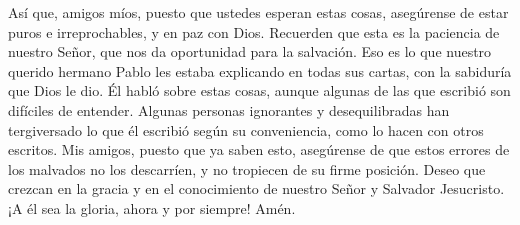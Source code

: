  Así que, amigos míos, puesto que ustedes esperan estas
cosas, asegúrense de estar puros e irreprochables, y en paz con Dios.
 Recuerden que esta es la paciencia de nuestro Señor, que
nos da oportunidad para la salvación. Eso es lo que nuestro querido
hermano Pablo les estaba explicando en todas sus cartas, con la
sabiduría que Dios le dio.  Él habló sobre estas cosas,
aunque algunas de las que escribió son difíciles de entender. Algunas
personas ignorantes y desequilibradas han tergiversado lo que él
escribió según su conveniencia, como lo hacen con otros escritos.
 Mis amigos, puesto que ya saben esto, asegúrense de que
estos errores de los malvados no los descarríen, y no tropiecen de su
firme posición.  Deseo que crezcan en la gracia y en el
conocimiento de nuestro Señor y Salvador Jesucristo. ¡A él sea la
gloria, ahora y por siempre! Amén.
